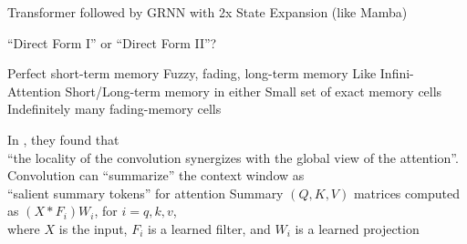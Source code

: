 \begin{slide}[\slideopts,toc={TransMamba}]{Transformer followed by GRNN with 2x State Expansion (like Mamba)}
\vspace{-1.6em}
\vspace{-2em}
\maybepause
{} %
\end{slide}


\begin{slide}[\slideopts,toc={Direct Forms}]{``Direct Form I'' or ``Direct Form II''?}
  \vspace{-1.6em}
  \vspace{-2em}
  \begin{multicols}{2}
    \begin{itemize}
    \mpitem Perfect short-term memory
    \mpitem Fuzzy, fading, long-term memory
    \mpitem Like Infini-Attention
      \columnbreak
    \mpitem Short/Long-term memory in either
    \mpitem Small set of exact memory cells
    \mpitem Indefinitely many fading-memory cells
    \end{itemize}
  \end{multicols}
  In , they found that\\
  ``the locality of the convolution synergizes with the global view of
  the attention''.
  \BIT
  \mpitem Convolution can ``summarize'' the context window as\\
  ``salient summary tokens'' for attention
  \mpitem Summary $(Q, K, V)$ matrices computed as $(X\ast F_i)W_i$, for $i=q,k,v$,\\
  where $X$ is the input, $F_i$ is a learned filter, and $W_i$ is a learned projection
  \EIT
\end{slide}

